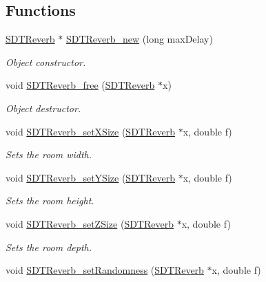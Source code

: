\subsection*{Functions}
\begin{DoxyCompactItemize}
\item 
\hyperlink{group__reverb_ga572fe1bba384610f4d05431c8f2bed73}{S\+D\+T\+Reverb} $\ast$ \hyperlink{group__reverb_gad797c84e5ea2bdd4a20412c90bfa8eb0}{S\+D\+T\+Reverb\+\_\+new} (long max\+Delay)
\begin{DoxyCompactList}\small\item\em Object constructor. \end{DoxyCompactList}\item 
void \hyperlink{group__reverb_ga0c23107b2b864dfa62fab6cb324df18e}{S\+D\+T\+Reverb\+\_\+free} (\hyperlink{group__reverb_ga572fe1bba384610f4d05431c8f2bed73}{S\+D\+T\+Reverb} $\ast$x)
\begin{DoxyCompactList}\small\item\em Object destructor. \end{DoxyCompactList}\item 
void \hyperlink{group__reverb_ga1fce189f6806f888f1b78d94d1f80100}{S\+D\+T\+Reverb\+\_\+set\+X\+Size} (\hyperlink{group__reverb_ga572fe1bba384610f4d05431c8f2bed73}{S\+D\+T\+Reverb} $\ast$x, double f)
\begin{DoxyCompactList}\small\item\em Sets the room width. \end{DoxyCompactList}\item 
void \hyperlink{group__reverb_ga867a5a0f5466f4ee67313af9d8318243}{S\+D\+T\+Reverb\+\_\+set\+Y\+Size} (\hyperlink{group__reverb_ga572fe1bba384610f4d05431c8f2bed73}{S\+D\+T\+Reverb} $\ast$x, double f)
\begin{DoxyCompactList}\small\item\em Sets the room height. \end{DoxyCompactList}\item 
void \hyperlink{group__reverb_ga4f34d4b5d03dc65dfc293444abdf75ff}{S\+D\+T\+Reverb\+\_\+set\+Z\+Size} (\hyperlink{group__reverb_ga572fe1bba384610f4d05431c8f2bed73}{S\+D\+T\+Reverb} $\ast$x, double f)
\begin{DoxyCompactList}\small\item\em Sets the room depth. \end{DoxyCompactList}\item 
void \hyperlink{group__reverb_ga6be003102de6fbf822315734b6a38ea2}{S\+D\+T\+Reverb\+\_\+set\+Randomness} (\hyperlink{group__reverb_ga572fe1bba384610f4d05431c8f2bed73}{S\+D\+T\+Reverb} $\ast$x, double f)

\end{DoxyCompactItemize}

